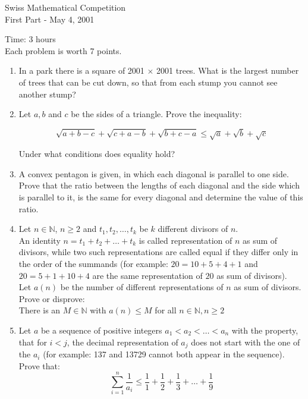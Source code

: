 \documentclass[12pt]{article}
\begin{document}
\pagestyle{empty}
\newcommand{\wi}{\hspace{1pt} < \hspace{-6pt} ) \hspace{2pt}}

\begin{center}
{\Large Swiss Mathematical Competition} \\
\medskip First Part - May 4, 2001
\end{center}
\vspace{4mm}
Time: 3 hours\\
Each problem is worth 7 points.


\begin{enumerate}
\item  In a park there is a square of 2001 $\times$ 2001 trees.
What is the largest number of trees that can be cut down, so that
from each stump you cannot see another stump?

\item Let $a, b$ and $c$ be the sides of a triangle. Prove the
inequality:

$$ \sqrt{a+b-c} + \sqrt{c+a-b} + \sqrt{b+c-a} \leq \sqrt{a} +
\sqrt{b} + \sqrt{c} $$

Under what conditions does equality hold?

\item A convex pentagon is given, in which each diagonal is
parallel to one side. Prove that the ratio between the lengths of
each diagonal and the side which is parallel to it, is the same
for every diagonal and determine the value of this ratio.

\item Let $n \in \mathbb{N}$, $n\geq2$ and $t_1,
t_2, \ldots, t_k$ be $k$ different divisors of $n$.\\
An identity $n=t_1+t_2+ \ldots +t_k$ is called representation of
$n$ as sum of divisors, while two such representations are called
equal if they differ only in the order of the summands (for
example: $20=10+5+4+1$ and $20=5+1+10+4$ are the same
representation of $20$ as sum of divisors). \\
Let $a(n)$ be the number of different representations of $n$ as
sum of divisors.\vspace {2mm}\\
\vspace {2mm}Prove or disprove:\\
There is an $M \in \mathbb{N}$ with $a(n)\leq M$ for all $n \in
\mathbb{N}, n\geq 2$

\item Let $a$ be a sequence of positive integers $a_1<a_2< \ldots
<a_n$ with the property, that for $i<j$, the decimal
representation of $a_j$ does not start with the one of the $a_i$
(for example: 137 and 13729 cannot both appear in the sequence).
Prove that:
$$\sum_{i=1}^n \frac{1}{a_i} \leq \frac{1}{1}+\frac{1}{2}+\frac{1}{3}+\ldots+\frac{1}{9}$$

\end{enumerate}
\pagebreak
\end{document}
